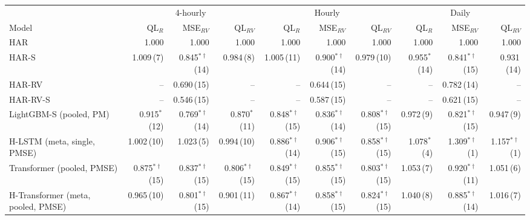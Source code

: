 \setlength{\tabcolsep}{3pt}
\begin{tabular}{lrrrrrrrrr}
\toprule
 & \multicolumn{3}{c}{4-hourly} & \multicolumn{3}{c}{Hourly} & \multicolumn{3}{c}{Daily} \\
\cmidrule(lr){2-4}\cmidrule(lr){5-7}\cmidrule(lr){8-10}
Model & QL$_R$ & MSE$_{RV}$ & QL$_{RV}$ & QL$_R$ & MSE$_{RV}$ & QL$_{RV}$ & QL$_R$ & MSE$_{RV}$ & QL$_{RV}$ \\
\midrule
HAR & 1.000 & 1.000 & 1.000 & 1.000 & 1.000 & 1.000 & 1.000 & 1.000 & 1.000 \\
HAR-S & 1.009{\scriptsize\,(7)} & 0.845$^{*\dagger}${\scriptsize\,(14)} & 0.984{\scriptsize\,(8)} & 1.005{\scriptsize\,(11)} & 0.900$^{*\dagger}${\scriptsize\,(14)} & 0.979{\scriptsize\,(10)} & 0.955$^{*}${\scriptsize\,(14)} & 0.841$^{*\dagger}${\scriptsize\,(15)} & 0.931{\scriptsize\,(14)} \\
HAR-RV & -- & 0.690{\scriptsize\,(15)} & -- & -- & 0.644{\scriptsize\,(15)} & -- & -- & 0.782{\scriptsize\,(14)} & -- \\
HAR-RV-S & -- & 0.546{\scriptsize\,(15)} & -- & -- & 0.587{\scriptsize\,(15)} & -- & -- & 0.621{\scriptsize\,(15)} & -- \\
LightGBM-S (pooled, PM) & 0.915$^{*}${\scriptsize\,(12)} & 0.769$^{*\dagger}${\scriptsize\,(14)} & 0.870$^{*}${\scriptsize\,(11)} & 0.848$^{*\dagger}${\scriptsize\,(15)} & 0.836$^{*\dagger}${\scriptsize\,(14)} & 0.808$^{*\dagger}${\scriptsize\,(15)} & 0.972{\scriptsize\,(9)} & 0.821$^{*\dagger}${\scriptsize\,(15)} & 0.947{\scriptsize\,(9)} \\
H-LSTM (meta, single, PMSE) & 1.002{\scriptsize\,(10)} & 1.023{\scriptsize\,(5)} & 0.994{\scriptsize\,(10)} & 0.886$^{*\dagger}${\scriptsize\,(14)} & 0.906$^{*\dagger}${\scriptsize\,(15)} & 0.858$^{*\dagger}${\scriptsize\,(15)} & 1.078$^{*}${\scriptsize\,(4)} & 1.309$^{*\dagger}${\scriptsize\,(1)} & 1.157$^{*\dagger}${\scriptsize\,(1)} \\
Transformer (pooled, PMSE) & 0.875$^{*\dagger}${\scriptsize\,(15)} & 0.837$^{*\dagger}${\scriptsize\,(15)} & 0.806$^{*\dagger}${\scriptsize\,(15)} & 0.849$^{*\dagger}${\scriptsize\,(15)} & 0.855$^{*\dagger}${\scriptsize\,(15)} & 0.803$^{*\dagger}${\scriptsize\,(15)} & 1.053{\scriptsize\,(7)} & 0.920$^{*\dagger}${\scriptsize\,(11)} & 1.051{\scriptsize\,(6)} \\
H-Transformer (meta, pooled, PMSE) & 0.965{\scriptsize\,(10)} & 0.801$^{*\dagger}${\scriptsize\,(15)} & 0.901{\scriptsize\,(11)} & 0.867$^{*\dagger}${\scriptsize\,(14)} & 0.858$^{*\dagger}${\scriptsize\,(15)} & 0.824$^{*\dagger}${\scriptsize\,(15)} & 1.040{\scriptsize\,(8)} & 0.885$^{*\dagger}${\scriptsize\,(14)} & 1.016{\scriptsize\,(7)} \\

\end{tabular}

